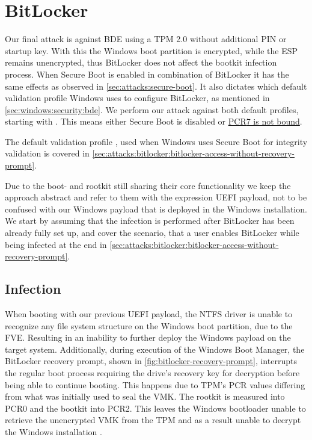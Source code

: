 \section{BitLocker}

Our final attack is against \ac{BDE} using a \ac{TPM} 2.0 without additional \ac{PIN} or startup key.
With this the Windows boot partition is encrypted, while the \ac{ESP} remains unencrypted, thus BitLocker does not affect the bootkit infection process.
When Secure Boot is enabled in combination of BitLocker it has the same effects as observed in \autoref{sec:attacks:secure-boot}.
It also dictates which default validation profile Windows uses to configure BitLocker, as mentioned in \autoref{sec:windows:security:bde}.
We perform our attack against both default profiles, starting with \hyperref[tab:pcr-usage]{}.
This means either Secure Boot is disabled or \hyperlink{pcr7-binding}{\ac{PCR}7 is not bound}.

The default validation profile \hyperref[tab:pcr-usage]{}, used when Windows uses Secure Boot for integrity validation is covered in \autoref{sec:attacks:bitlocker:bitlocker-access-without-recovery-prompt}.

Due to the boot- and rootkit still sharing their core functionality we keep the approach abstract and refer to them with the expression \ac{UEFI} payload, not to be confused with our Windows payload that is deployed in the Windows installation.
We start by assuming that the infection is performed after BitLocker has been already fully set up, and cover the scenario, that a user enables BitLocker while being infected at the end in \autoref{sec:attacks:bitlocker:bitlocker-access-without-recovery-prompt}.


\subsection{Infection}

When booting with our previous \ac{UEFI} payload, the \ac{NTFS} driver is unable to recognize any file system structure  on the Windows boot partition, due to the \ac{FVE}.
Resulting in an inability to further deploy the Windows payload on the target system.
Additionally, during execution of the Windows Boot Manager, the BitLocker recovery prompt, shown in \autoref{fig:bitlocker-recovery-prompt}, interrupts the regular boot process requiring the drive's recovery key for decryption before being able to continue booting.
This happens due to \ac{TPM}'s \ac{PCR} values differing from what was initially used to seal the \ac{VMK}.
The rootkit is measured into \ac{PCR}0 and the bootkit into \ac{PCR}2.
This leaves the Windows bootloader unable to retrieve the unencrypted \ac{VMK} from the \ac{TPM} and as a result unable to decrypt the Windows installation \cite[Section 12]{windows-internals-7-part2}.

